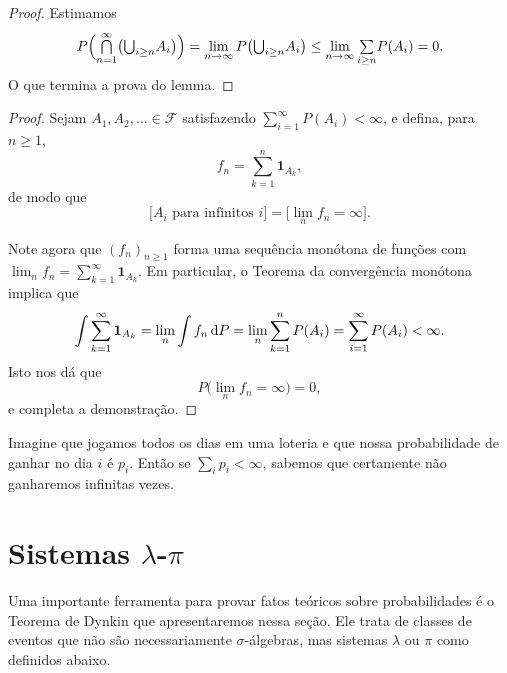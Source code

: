 \begin{proof}
  Estimamos
  \begin{equation}
    P \Big( {\operatorname*{{\textstyle \bigcap}}_{n = 1}^\infty} \big({\operatorname*{{\textstyle \bigcup}}\nolimits_{i \geq n}} A_i \big) \Big) = \lim_{n\to \infty} P \big( {\operatorname*{{\textstyle \bigcup}}\nolimits_{i \geq n}} A_i \big) \leq \lim_{n\to \infty} {\textstyle\sum\limits_{i \geq n}} P(A_i) = 0.
  \end{equation}
  O que termina a prova do lemma.
\end{proof}

\begin{proof}
Sejam $A_1, A_2, \dots \in \mathcal{F}$ satisfazendo $\sum_{i = 1}^\infty P(A_i) < \infty$, e defina, para $n \geq 1$,
\begin{equation}
f_{n} = \sum_{k=1}^{n} \textbf{1}_{A_{k}},
\end{equation} 
de modo que
\begin{equation}
\big[ \text{$A_i$ para infinitos $i$} \big] = \big[ \lim_{n} f_{n} = \infty \big].
\end{equation}

Note agora que $( f_{n} )_{n \geq 1}$ forma uma sequência monótona de funções com $\lim_{n} f_{n} = \sum_{k=1}^{\infty} \textbf{1}_{A_{k}}$. Em particular, o Teorema da convergência monótona implica que
\begin{equation}
\int \sum_{k=1}^{\infty} \textbf{1}_{A_{k}} = \lim_{n} \int f_{n} \mathop{}\!\mathrm{d} P = \lim_{n} \sum_{k=1}^{n} P(A_{i}) = \sum_{i=1}^{\infty} P(A_{i}) < \infty.
\end{equation}
Isto nos dá que
\begin{equation}
P \big( \lim_{n} f_{n} = \infty) = 0,
\end{equation}
e completa a demonstração.
\end{proof}

Imagine que jogamos todos os dias em uma loteria e que nossa probabilidade de ganhar no dia $i$ é $p_i$.
Então se $\sum_i p_i < \infty$, sabemos que certamente não ganharemos infinitas vezes.

\section{Sistemas \texorpdfstring{$\lambda$-$\pi$}{lambda-pi}}

Uma importante ferramenta para provar fatos teóricos sobre probabilidades é o Teorema de Dynkin que apresentaremos nessa seção.
Ele trata de classes de eventos que não são necessariamente $\sigma$-álgebras, mas sistemas $\lambda$ ou $\pi$ como definidos abaixo.

